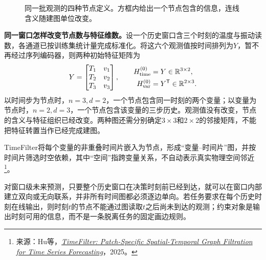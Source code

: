 \begin{figure}[htbp]
\caption{同一批观测的四种节点定义。方框内给出一个节点包含的信息，连线含义随建图单位改变。}
\label{fig:graph-node-units}
\end{figure}

\textbf{同一窗口怎样改变节点数与特征维数。}设一个历史窗口含三个时刻的温度与振动读数，各通道已按训练集统计量完成标准化。将这六个观测值按时间排列为$Y$，暂不再经过序列编码器，则两种初始特征矩阵为
\[
 Y=\begin{bmatrix}T_1&v_1\\T_2&v_2\\T_3&v_3\end{bmatrix},\qquad
 \begin{aligned}
  H_{\mathrm{time}}^{(0)}&=Y\in\mathbb{R}^{3\times2},\\
  H_{\mathrm{var}}^{(0)}&=Y^{\mathsf T}\in\mathbb{R}^{2\times3}.
 \end{aligned}
\]
以时间步为节点时，$n=3,d=2$，一个节点包含同一时刻的两个变量；以变量为节点时，$n=2,d=3$，一个节点包含该变量的三步历史。观测值没有改变，节点的含义与特征组织已经改变。两种图还需分别确定$3\times3$和$2\times2$的邻接矩阵，不能把特征转置当作已经完成建图。

TimeFilter将每个变量的非重叠时间片嵌入为节点，形成“变量--时间片”图，并按时间片筛选时空依赖，其中“空间”指跨变量关系，不自动表示真实物理空间邻近\footnote{来源：Hu等，\href{https://proceedings.mlr.press/v267/hu25ac.html}{\textit{TimeFilter: Patch-Specific Spatial-Temporal Graph Filtration for Time Series Forecasting}}，2025。}。

对窗口级未来预测，只要整个历史窗口在决策时刻前已经到达，就可以在窗口内部建立双向或无向联系，并非所有时间图都必须逐边单向。若任务要求在每个历史时刻在线输出，则时刻$t$的节点不能通过图读取$t$之后尚未到达的观测；约束对象是输出时刻可用的信息，而不是一条脱离任务的固定画边规则。

